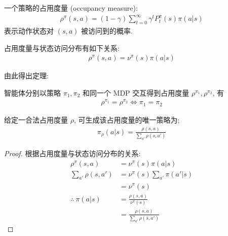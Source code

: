 \begin{definition}[占用度量]
    一个策略的占用度量 (occupancy measure):
    \begin{align*}
        \rho^\pi(s,a) = (1-\gamma) \sum_{t=0}^\infty \gamma^t P_t^\pi(s)\pi(a|s)
    \end{align*}
    表示动作状态对 $(s,a)$ 被访问到的概率. 
\end{definition}

占用度量与状态访问分布有如下关系:
\begin{align*}
    \rho^\pi(s,a)=\nu^\pi(s)\pi(a|s)
\end{align*}

由此得出定理:
\begin{theorem}
    智能体分别以策略 $\pi_1, \pi_2$ 和同一个 MDP 交互得到占用度量 $\rho^{\pi_1}, \rho^{\pi_2}$, 有
    \begin{align*}
        \rho^{\pi_1} = \rho^{\pi_2} \iff \pi_1 = \pi_2
    \end{align*}
\end{theorem}

\begin{theorem}
    给定一合法占用度量 $\rho$, 可生成该占用度量的唯一策略为;
    \begin{align*}
        \pi_\rho(a|s) = \frac{\rho(s,a)}{\sum_{a'}\rho(s,a')}
    \end{align*}
    
\end{theorem}

\begin{proof}
    根据占用度量与状态访问分布的关系: 
    \begin{align*}
        \rho^\pi(s,a)&=\nu^\pi(s)\pi(a|s)\\
        \sum_{a'}\rho(s,a') &= \nu^\pi(s)\sum_{a'}\pi(a'|s) \\
        &= \nu^\pi(s) \\
        \therefore\ \pi(a|s)  &=\frac{\rho(s,a)}{\nu^\pi(s)} \\
        &=\frac{\rho(s,a)}{\sum_{a'}\rho(s,a')}
    \end{align*}
\end{proof}

